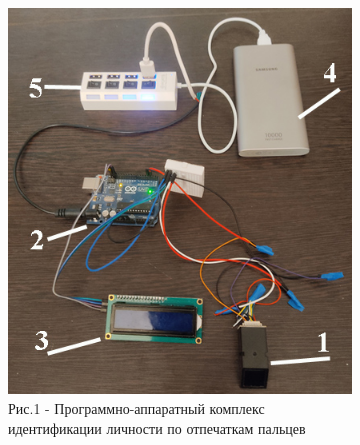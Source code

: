\begin{figure}[H]
    \centering
    \begin{subfigure}[t]{0.4\textwidth} %
        \centering
        \includegraphics[width=\textwidth]{media/ict/image1}
        \caption*{Рис.1 - Программно-аппаратный комплекс идентификации личности по отпечаткам пальцев}
    \end{subfigure}
    \hspace{0.05\textwidth} %
    \begin{subfigure}[t]{0.4\textwidth} %
        \centering

\end{subfigure}
\end{figure}
